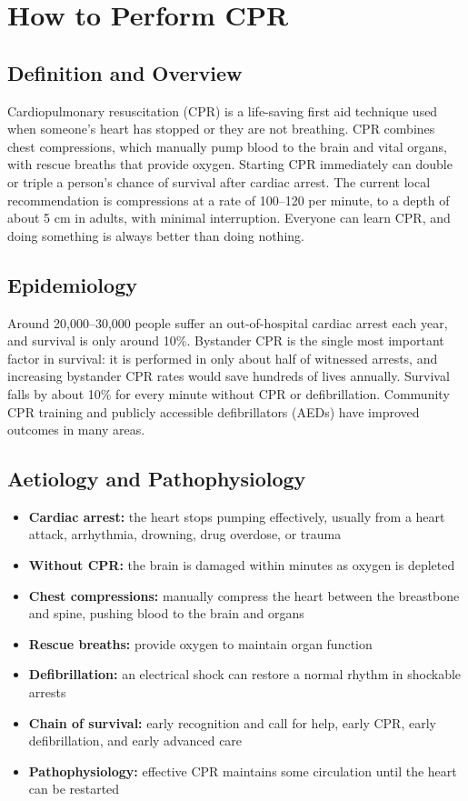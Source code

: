 \chapter{How to Perform CPR}

\section*{Definition and Overview}
Cardiopulmonary resuscitation (CPR) is a life-saving first aid technique used when someone's heart has stopped or they are not breathing. CPR combines chest compressions, which manually pump blood to the brain and vital organs, with rescue breaths that provide oxygen. Starting CPR immediately can double or triple a person's chance of survival after cardiac arrest. The current local recommendation is compressions at a rate of 100--120 per minute, to a depth of about 5 cm in adults, with minimal interruption. Everyone can learn CPR, and doing something is always better than doing nothing.

\section*{Epidemiology}
Around 20,000--30,000 people suffer an out-of-hospital cardiac arrest each year, and survival is only around 10\%. Bystander CPR is the single most important factor in survival: it is performed in only about half of witnessed arrests, and increasing bystander CPR rates would save hundreds of lives annually. Survival falls by about 10\% for every minute without CPR or defibrillation. Community CPR training and publicly accessible defibrillators (AEDs) have improved outcomes in many areas.

\section*{Aetiology and Pathophysiology}
\begin{itemize}
    \item \textbf{Cardiac arrest:} the heart stops pumping effectively, usually from a heart attack, arrhythmia, drowning, drug overdose, or trauma
    \item \textbf{Without CPR:} the brain is damaged within minutes as oxygen is depleted
    \item \textbf{Chest compressions:} manually compress the heart between the breastbone and spine, pushing blood to the brain and organs
    \item \textbf{Rescue breaths:} provide oxygen to maintain organ function
    \item \textbf{Defibrillation:} an electrical shock can restore a normal rhythm in shockable arrests
    \item \textbf{Chain of survival:} early recognition and call for help, early CPR, early defibrillation, and early advanced care
    \item \textbf{Pathophysiology:} effective CPR maintains some circulation until the heart can be restarted
\end{itemize}

